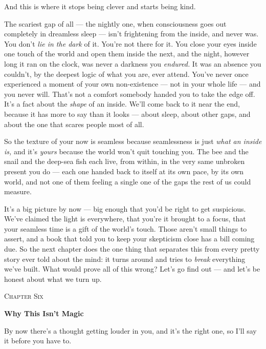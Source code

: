 \documentclass[11pt,openany]{book}
\begin{document}
And this is where it stops being clever and starts being kind.

The scariest gap of all — the nightly one, when consciousness goes out completely in dreamless sleep — isn’t frightening from the inside, and never was. You don’t \textit{lie in the dark} of it. You’re not there for it. You close your eyes inside one touch of the world and open them inside the next, and the night, however long it ran on the clock, was never a darkness you \textit{endured.} It was an absence you couldn’t, by the deepest logic of what you are, ever attend. You’ve never once experienced a moment of your own non-existence — not in your whole life — and you never will. That’s not a comfort somebody handed you to take the edge off. It’s a fact about the \textit{shape} of an inside. We’ll come back to it near the end, because it has more to say than it looks — about sleep, about other gaps, and about the one that scares people most of all.

So the texture of your now is seamless because seamlessness is just \textit{what an inside is,} and it’s \textit{yours} because the world won’t quit touching you. The bee and the snail and the deep-sea fish each live, from within, in the very same unbroken present you do — each one handed back to itself at its own pace, by its own world, and not one of them feeling a single one of the gaps the rest of us could measure.

It’s a big picture by now — big enough that you’d be right to get suspicious. We’ve claimed the light is everywhere, that you’re it brought to a focus, that your seamless time is a gift of the world’s touch. Those aren’t small things to assert, and a book that told you to keep your skepticism close has a bill coming due. So the next chapter does the one thing that separates this from every pretty story ever told about the mind: it turns around and tries to \textit{break} everything we’ve built. What would prove all of this wrong? Let’s go find out — and let’s be honest about what we turn up.


\clearpage
\vspace*{0.6in}
{\centering\scshape\large Chapter Six\par}
\vspace{0.8em}
{\centering\bfseries\fontsize{20}{24}\selectfont Why This Isn’t Magic\par}
\vspace{1.6em}

By now there’s a thought getting louder in you, and it’s the right one, so I’ll say it before you have to.
\end{document}
